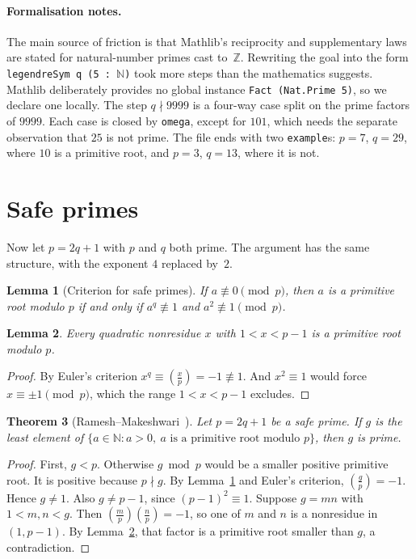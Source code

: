 \documentclass[11pt]{article}
\newtheorem{theorem}{Theorem}
\newtheorem{lemma}[theorem]{Lemma}
\theoremstyle{remark}
\newcommand{\leg}[2]{\left(\frac{#1}{#2}\right)}
\newcommand{\lean}[1]{\texttt{#1}}
\begin{document}
\paragraph{Formalisation notes.}
The main source of friction is that Mathlib's reciprocity and supplementary laws are stated for
natural-number primes cast to~$\mathbb{Z}$. Rewriting the goal into the form
\lean{legendreSym q (5 : $\mathbb{N}$)} took more steps than the mathematics suggests. Mathlib deliberately
provides no global instance \lean{Fact (Nat.Prime 5)}, so we declare one locally. The step
$q\nmid 9999$ is a four-way case split on the prime factors of $9999$. Each case is closed by
\lean{omega}, except for $101$, which needs the separate observation that $25$ is not prime. The
file ends with two \lean{example}s: $p=7$, $q=29$, where $10$ is a primitive root, and $p=3$,
$q=13$, where it is not.

\section{Safe primes}

Now let $p=2q+1$ with $p$ and $q$ both prime. The argument has the same structure, with the
exponent $4$ replaced by~$2$.

\begin{lemma}[Criterion for safe primes]\label{lem:crit2}
If $a\not\equiv 0\pmod p$, then $a$ is a primitive root modulo $p$ if and only if
$a^q\not\equiv 1$ and $a^2\not\equiv 1\pmod p$.
\end{lemma}

\begin{lemma}\label{lem:nonres}
Every quadratic nonresidue $x$ with $1<x<p-1$ is a primitive root modulo $p$.
\end{lemma}
\begin{proof}
By Euler's criterion $x^q\equiv\leg{x}{p}=-1\not\equiv 1$. And $x^2\equiv 1$ would force
$x\equiv\pm1\pmod p$, which the range $1<x<p-1$ excludes.
\end{proof}

\begin{theorem}[Ramesh--Makeshwari~\cite{RM}]\label{thm:rm}
Let $p=2q+1$ be a safe prime. If $g$ is the least element of
$\{a\in\mathbb{N}: a>0,\ a \text{ is a primitive root modulo } p\}$, then $g$ is prime.
\end{theorem}
\begin{proof}
First, $g<p$. Otherwise $g\bmod p$ would be a smaller positive primitive root. It is positive
because $p\nmid g$. By Lemma~\ref{lem:crit2} and Euler's criterion, $\leg{g}{p}=-1$. Hence
$g\neq 1$. Also $g\neq p-1$, since $(p-1)^2\equiv 1$. Suppose $g=mn$ with $1<m,n<g$. Then
$\leg{m}{p}\leg{n}{p}=-1$, so one of $m$ and $n$ is a nonresidue in $(1,p-1)$. By
Lemma~\ref{lem:nonres}, that factor is a primitive root smaller than $g$, a contradiction.
\end{proof}
\end{document}

